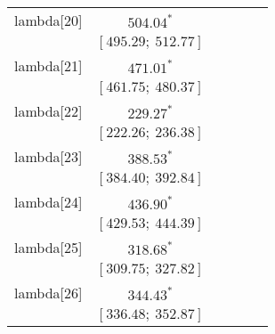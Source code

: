 \begin{table}
\begin{center}
\begin{tabular}{l c c c c c }
lambda[20]  & $504.04^{*}$                     &                           &                           &                         &                         \\
            & $[495.29;\ 512.77]$              &                           &                           &                         &                         \\
lambda[21]  & $471.01^{*}$                     &                           &                           &                         &                         \\
            & $[461.75;\ 480.37]$              &                           &                           &                         &                         \\
lambda[22]  & $229.27^{*}$                     &                           &                           &                         &                         \\
            & $[222.26;\ 236.38]$              &                           &                           &                         &                         \\
lambda[23]  & $388.53^{*}$                     &                           &                           &                         &                         \\
            & $[384.40;\ 392.84]$              &                           &                           &                         &                         \\
lambda[24]  & $436.90^{*}$                     &                           &                           &                         &                         \\
            & $[429.53;\ 444.39]$              &                           &                           &                         &                         \\
lambda[25]  & $318.68^{*}$                     &                           &                           &                         &                         \\
            & $[309.75;\ 327.82]$              &                           &                           &                         &                         \\
lambda[26]  & $344.43^{*}$                     &                           &                           &                         &                         \\
            & $[336.48;\ 352.87]$              &                           &                           &                         &                         \\

\end{tabular}
\end{center}
\end{table}
